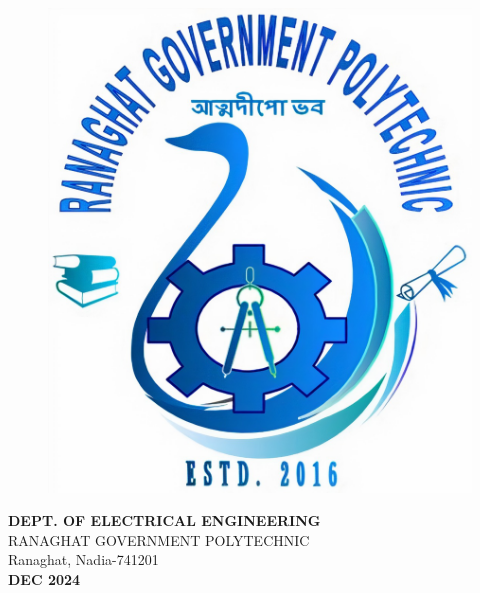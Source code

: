 \documentclass[12pt,a4paper]{report}
\begin{document}
\begin{center}
\begin{figure}[H]
    \centering
    \includegraphics[scale=0.1]{images/institute_logo.png}
    \label{fig:institute_logo}
\end{figure}
\textbf{DEPT. OF ELECTRICAL ENGINEERING}\\

RANAGHAT GOVERNMENT POLYTECHNIC\\

Ranaghat, Nadia-741201 \\
\textbf{DEC 2024}\\
\end{center}

\thispagestyle{empty}

\newpage



\newpage


\end{document}

